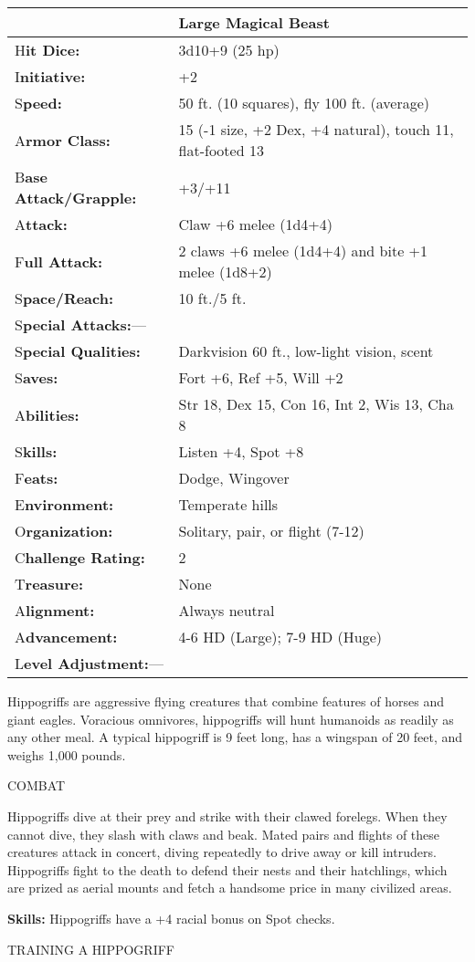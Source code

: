 \documentclass{article}
\begin{document}
\begin{tabular}{|>{\raggedright}p{91pt}|>{\raggedright}p{226pt}|}
\hline
  & Large Magical Beast\tabularnewline
\hline
H\textbf{it Dice:} & 3d10+9 (25 hp)\tabularnewline
\hline
I\textbf{nitiative:} & +2\tabularnewline
\hline
S\textbf{peed:} & 50 ft. (10 squares), fly 100 ft. (average)\tabularnewline
\hline
A\textbf{rmor Class:} & 15 (-1 size, +2 Dex, +4 natural), touch 11, flat-footed 
13\tabularnewline
\hline
B\textbf{ase Attack/Grapple:} & +3/+11\tabularnewline
\hline
A\textbf{ttack:} & Claw +6 melee (1d4+4)\tabularnewline
\hline
F\textbf{ull Attack:} & 2 claws +6 melee (1d4+4) and bite +1 melee (1d8+2)\tabularnewline
\hline
S\textbf{pace/Reach:} & 10 ft./5 ft.\tabularnewline
\hline
S\textbf{pecial Attacks:}--- & \tabularnewline
\hline
S\textbf{pecial Qualities:} & Darkvision 60 ft., low-light vision, scent\tabularnewline
\hline
S\textbf{aves:} & Fort +6, Ref +5, Will +2\tabularnewline
\hline
A\textbf{bilities:} & Str 18, Dex 15, Con 16, Int 2, Wis 13, Cha 8\tabularnewline
\hline
S\textbf{kills:} & Listen +4, Spot +8\tabularnewline
\hline
F\textbf{eats:} & Dodge, Wingover\tabularnewline
\hline
E\textbf{nvironment:} & Temperate hills\tabularnewline
\hline
O\textbf{rganization:} & Solitary, pair, or flight (7-12)\tabularnewline
\hline
C\textbf{hallenge Rating:} & 2\tabularnewline
\hline
T\textbf{reasure:} & None\tabularnewline
\hline
A\textbf{lignment:} & Always neutral\tabularnewline
\hline
A\textbf{dvancement:} & 4-6 HD (Large); 7-9 HD (Huge)\tabularnewline
\hline
L\textbf{evel Adjustment:}--- & \tabularnewline
\hline
\end{tabular}

Hippogriffs are aggressive flying creatures that combine features of horses and 
giant eagles. Voracious omnivores, hippogriffs will hunt humanoids as readily as 
any other meal. A typical hippogriff is 9 feet long, has a wingspan of 20 feet, 
and weighs 1,000 pounds.

COMBAT

Hippogriffs dive at their prey and strike with their clawed forelegs. When they 
cannot dive, they slash with claws and beak. Mated pairs and flights of these creatures 
attack in concert, diving repeatedly to drive away or kill intruders. Hippogriffs 
fight to the death to defend their nests and their hatchlings, which are prized 
as aerial mounts and fetch a handsome price in many civilized areas.

\textbf{Skills:} Hippogriffs have a +4 racial bonus on Spot checks.

TRAINING A HIPPOGRIFF
\end{document}
